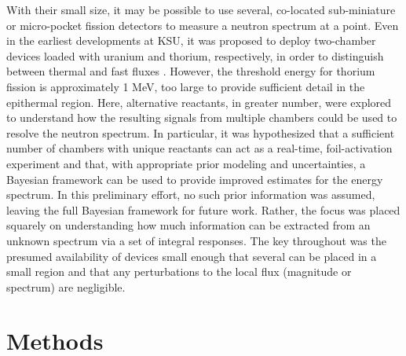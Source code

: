 \documentclass[journal]{IEEEtran}
\begin{document}
With their small size, it may be possible to use several, co-located sub-miniature or micro-pocket fission detectors to measure a neutron spectrum at a point. Even in the earliest developments at KSU, it was proposed to deploy two-chamber devices loaded with uranium and thorium, respectively, in order to distinguish between thermal and fast fluxes \cite{mcgregor2005micro}.  However, the threshold energy for thorium fission is approximately 1 MeV, too large to provide sufficient detail in the epithermal region. Here, alternative reactants, in greater number, were explored to understand how the resulting signals from multiple chambers could be used to resolve the neutron spectrum.  In particular, it was hypothesized that  a sufficient number of chambers with unique reactants can act as a real-time, foil-activation experiment and that, with appropriate prior modeling and uncertainties, a Bayesian framework can be used to provide improved estimates for the energy spectrum.  In this preliminary effort, no such prior information was assumed, leaving the full Bayesian framework for future work.  Rather, the focus was placed squarely on understanding how much information can be extracted from an unknown spectrum via a set of integral responses. The key throughout was the presumed availability of devices small enough that several can be placed in a small region and that any perturbations to the local flux (magnitude or spectrum) are negligible.

\section{Methods}
\end{document}
